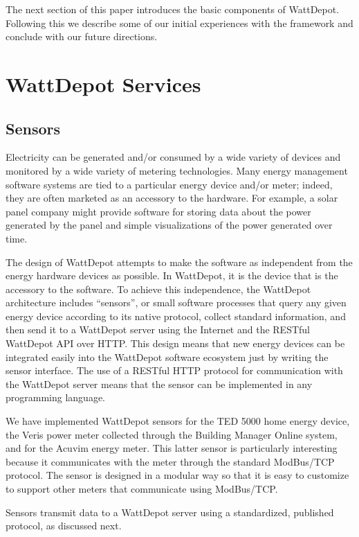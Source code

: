 \documentclass[conference]{IEEEtran}
\begin{document}
The next section of this paper introduces the basic components of
WattDepot. Following this we describe some of our initial experiences with
the framework and conclude with our future directions. 

\section{WattDepot Services}

\subsection{Sensors}

Electricity can be generated and/or consumed by a wide variety of devices
and monitored by a wide variety of metering technologies.  Many energy
management software systems are tied to a particular energy device and/or
meter; indeed, they are often marketed as an accessory to the hardware.  For
example, a solar panel company might provide software for storing data
about the power generated by the panel and simple visualizations of the
power generated over time.

The design of WattDepot attempts to make the software as independent from
the energy hardware devices as possible.  In WattDepot, it is the device
that is the accessory to the software.  To achieve this independence, the
WattDepot architecture includes ``sensors'', or small software processes
that query any given energy device according to its native protocol,
collect standard information, and then send it to a WattDepot server using
the Internet and the RESTful WattDepot API over HTTP.  This design means
that new energy devices can be integrated easily into the WattDepot
software ecosystem just by writing the sensor interface.  The use of a
RESTful HTTP protocol for communication with the WattDepot server means
that the sensor can be implemented in any programming language.

We have implemented WattDepot sensors for the TED 5000 home energy device, 
the Veris power meter collected through the Building Manager Online system,
and for the Acuvim energy meter. This latter sensor is particularly
interesting because it communicates with the meter through the standard
ModBus/TCP protocol. The sensor is designed in a modular way so that it is
easy to customize to support other meters that communicate using ModBus/TCP.

Sensors transmit data to a WattDepot server using a standardized, published
protocol, as discussed next.
\end{document}
